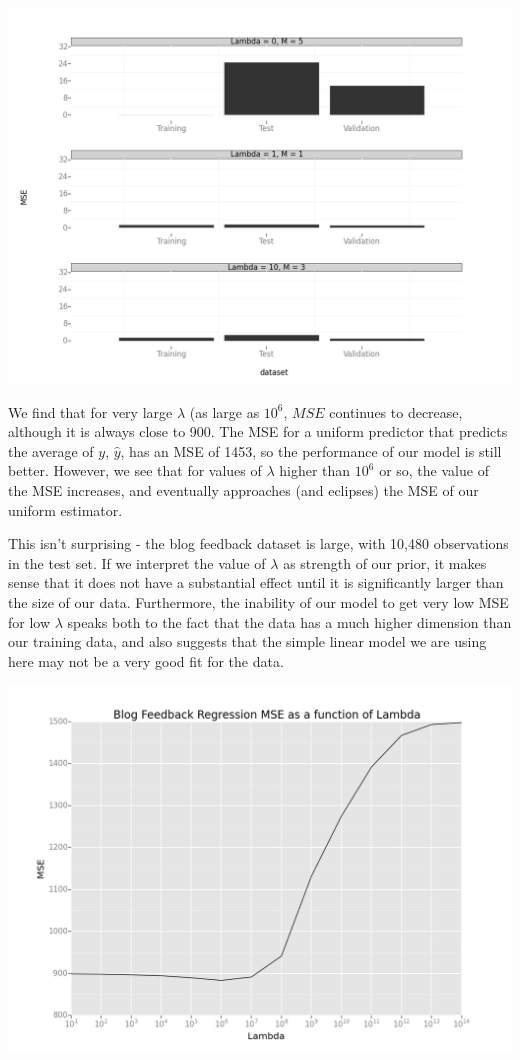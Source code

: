 \documentclass[10pt]{article}
\begin{document}
\begin{center}
\includegraphics[scale=.4]{MSE_comparison.png}
\end{center}

We find that for very large $\lambda$ (as large as $10^6$, $MSE$ continues to decrease, although it is always close to 900. The MSE for a uniform predictor that predicts the average of $y$, $\hat{y}$, has an MSE of 1453, so the performance of our model is still better. However, we see that for values of $\lambda$ higher than $10^6$ or so, the value of the MSE increases, and eventually approaches (and eclipses) the MSE of our uniform estimator.

This isn't surprising - the blog feedback dataset is large, with 10,480 observations in the test set. If we interpret the value of $\lambda$ as strength of our prior, it makes sense that it does not have a substantial effect until it is significantly larger than the size of our data. Furthermore, the inability of our model to get very low MSE for low $\lambda$ speaks both to the fact that the data has a much higher dimension than our training data, and also suggests that the simple linear model we are using here may not be a very good fit for the data.

\begin{center}
\includegraphics[scale=.4]{BlogFeedbackRegressionMSE.png}
\end{center}
\end{document}
